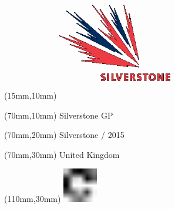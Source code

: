 \null\newpage
\begin{textblock*}{50mm}(15mm,10mm)%
\includegraphics[width=50mm]{LG/SIL.png}
\end{textblock*}
\begin{textblock*}{130mm}(70mm,10mm)%
{\fontsize{20}{20}\selectfont Silverstone GP}\\
\end{textblock*}
\begin{textblock*}{120mm}(70mm,20mm)%
{\fontsize{16}{16}\selectfont Silverstone / 2015}\\
\end{textblock*}
\begin{textblock*}{120mm}(70mm,30mm)%
{\fontsize{12}{12}\selectfont United Kingdom}
\end{textblock*}
\begin{textblock*}{30mm}(110mm,30mm)%
\centering
\includegraphics[height=15mm]{icons/fa-rotate-right.pdf}
\end{textblock*}

